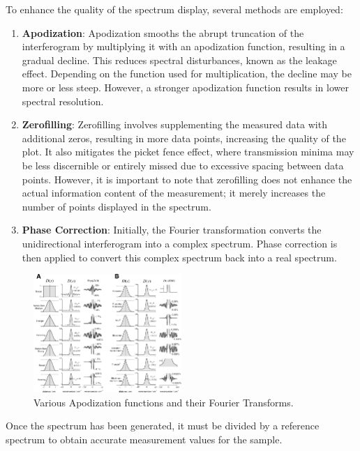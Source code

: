 \documentclass{article}
\begin{document}
To enhance the quality of the spectrum display, several methods are employed:
\begin{enumerate}
    \item \textbf{Apodization}: Apodization smooths the abrupt truncation of the interferogram by multiplying it with an apodization function, resulting in a gradual decline. This reduces spectral disturbances, known as the leakage effect. Depending on the function used for multiplication, the decline may be more or less steep. However, a stronger apodization function results in lower spectral resolution.
    \item \textbf{Zerofilling}: Zerofilling involves supplementing the measured data with additional zeros, resulting in more data points, increasing the quality of the plot. It also mitigates the picket fence effect, where transmission minima may be less discernible or entirely missed due to excessive spacing between data points. However, it is important to note that zerofilling does not enhance the actual information content of the measurement; it merely increases the number of points displayed in the spectrum.
	\item \textbf{Phase Correction}: Initially, the Fourier transformation converts the unidirectional interferogram into a complex spectrum. Phase correction is then applied to convert this complex spectrum back into a real spectrum.
\end{enumerate}

\begin{figure}[h]
	\centering
	\includegraphics[width=0.5\textwidth]{Figures/Introduction/Apodization.png}
	\caption{Various Apodization functions and their Fourier Transforms. \cite{article}}
	\label{fig:apdoization}
\end{figure}

Once the spectrum has been generated, it must be divided by a reference spectrum to obtain accurate measurement values for the sample.

\pagebreak{}
\end{document}
